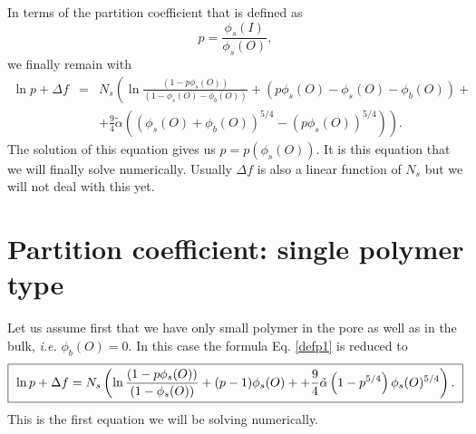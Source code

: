 \documentclass[11pt,a4paper]{article}
\begin{document}
In terms of the partition coefficient that is defined as
$$p = {\frac{\phi_s(I)}{\phi_s(O)}},$$we finally remain with
\begin{eqnarray}
\ln{p} + \Delta f &=& N_s \left( \ln\frac{(1 - p\phi_s(O))}{(1 - \phi_s(O) - \phi_b(O))} + (p\phi_{s}(O) - \phi_s(O) - \phi_b(O))+ \right.\nonumber\\
&& \left. + \frac{9}{4} \tilde\alpha \left( \left( \phi_s(O) + \phi_b(O)\right)^{5/4} - (p\phi_s(O))^{5/4} \right)\right).
\label{defp1}
\end{eqnarray}
The solution of this equation gives us $p = p(\phi_s(O))$. 
It is this equation that we will finally solve numerically. Usually $ \Delta f$ is also a linear function of $N_s$ but we will not deal with this yet. 

\section{Partition coefficient: single polymer type}

Let us assume first that we have only small polymer in the pore as well as in the bulk, {\sl i.e.} $\phi_b(O) = 0$. In this case the formula Eq. \ref{defp1} is reduced to 
\begin{equation}
\fbox{
    $\displaystyle{
\ln{p} + \Delta f = N_s \left( \ln\frac{(1 - p\phi_s(O))}{(1 - \phi_s(O))} + (p - 1) \phi_{s}(O)+ + \frac{9}{4} \tilde\alpha \left(1 - p^{5/4} \right)\phi_s(O)^{5/4}\right).}$
    }
\label{defp2}
\end{equation}
This is the first equation we will be solving numerically.
\end{document}
